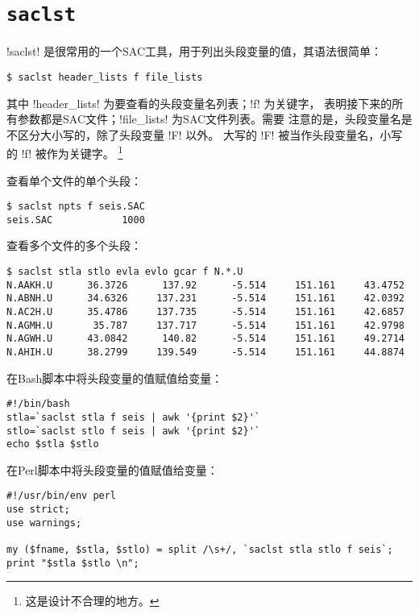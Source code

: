 \section{\texttt{saclst}}
\label{sec:saclst}

!saclst! 是很常用的一个SAC工具，用于列出头段变量的值，其语法很简单：
\begin{verbatim}
$ saclst header_lists f file_lists
\end{verbatim}
其中 !header_lists! 为要查看的头段变量名列表；!f! 为关键字，
表明接下来的所有参数都是SAC文件；!file_lists! 为SAC文件列表。需要
注意的是，头段变量名是不区分大小写的，除了头段变量 !F! 以外。
大写的 !F! 被当作头段变量名，小写的 !f! 被作为关键字。
\footnote{这是设计不合理的地方。}

查看单个文件的单个头段：
\begin{verbatim}
$ saclst npts f seis.SAC
seis.SAC            1000
\end{verbatim}

查看多个文件的多个头段：
\begin{verbatim}
$ saclst stla stlo evla evlo gcar f N.*.U
N.AAKH.U      36.3726      137.92      -5.514     151.161     43.4752
N.ABNH.U      34.6326     137.231      -5.514     151.161     42.0392
N.AC2H.U      35.4786     137.735      -5.514     151.161     42.6857
N.AGMH.U       35.787     137.717      -5.514     151.161     42.9798
N.AGWH.U      43.0842      140.82      -5.514     151.161     49.2714
N.AHIH.U      38.2799     139.549      -5.514     151.161     44.8874
\end{verbatim}

在Bash脚本中将头段变量的值赋值给变量：
\begin{verbatim}
#!/bin/bash
stla=`saclst stla f seis | awk '{print $2}'`
stlo=`saclst stlo f seis | awk '{print $2}'`
echo $stla $stlo
\end{verbatim}

在Perl脚本中将头段变量的值赋值给变量：
\begin{verbatim}
#!/usr/bin/env perl
use strict;
use warnings;

my ($fname, $stla, $stlo) = split /\s+/, `saclst stla stlo f seis`;
print "$stla $stlo \n";
\end{verbatim}
